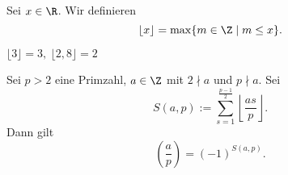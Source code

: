 \addtocounter{video}{1}
\begin{defn*}
	Sei\video{} $x \in \R$. Wir definieren
	\[ \lfloor x \rfloor = \max\{m \in \Z\mid m \leq x\}. \]
\end{defn*}

\begin{exmp*}
	\( \lfloor 3 \rfloor = 3,\ \lfloor2,8\rfloor = 2 \)
\end{exmp*}

\begin{lem}\autolabel
	Sei $p>2$ eine Primzahl, $a \in \Z$ mit $2 \nmid a$ und $p \nmid a$. Sei 
	\[ S(a,p) := \sum_{s = 1}^{\frac{p-1}{2}} \left\lfloor \frac{as}{p}\right\rfloor. \]
	Dann gilt
	\[ \left(\frac{a}{p}\right) = (-1)^{S(a,p)}. \]
\end{lem}
